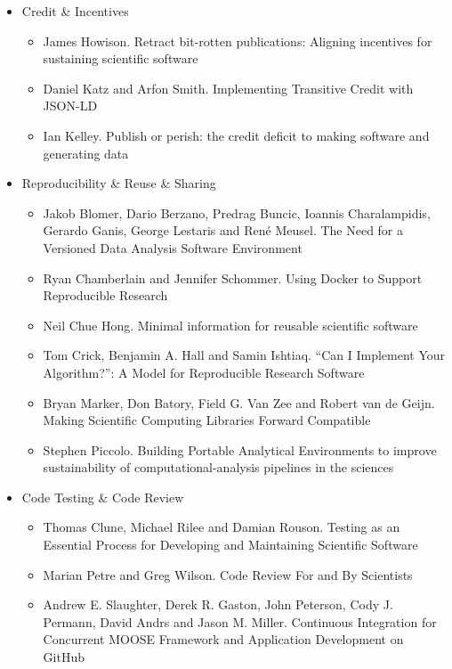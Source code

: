 \documentclass[11pt, oneside]{amsart}
\begin{document}
\begin{itemize}
\item Credit \& Incentives
\begin{itemize}
\item James Howison. Retract bit-rotten publications: Aligning incentives for sustaining scientific software~\cite{wssspe2_howison}
\item Daniel Katz and Arfon Smith. Implementing Transitive Credit with {JSON-LD}~\cite{wssspe2_katz}
\item Ian Kelley. Publish or perish: the credit deficit to making software and generating data~\cite{wssspe2_kelley}
\end{itemize}

\item Reproducibility \& Reuse \& Sharing
\begin{itemize}
\item Jakob Blomer, Dario Berzano, Predrag Buncic, Ioannis Charalampidis, Gerardo Ganis, George Lestaris and Ren\'{e} Meusel. The Need for a Versioned Data Analysis Software Environment~\cite{wssspe2_blomer}
\item Ryan Chamberlain and Jennifer Schommer. Using {Docker} to Support Reproducible Research~\cite{wssspe2_chamberlain}
\item Neil Chue Hong. Minimal information for reusable scientific software~\cite{wssspe2_chue_hong}
\item Tom Crick, Benjamin A. Hall and Samin Ishtiaq. ``Can I Implement Your Algorithm?'': A Model for Reproducible Research Software~\cite{wssspe2_crick}
\item Bryan Marker, Don Batory, Field G. Van Zee and Robert van de Geijn. Making Scientific Computing Libraries Forward Compatible~\cite{wssspe2_marker}
\item Stephen Piccolo. Building Portable Analytical Environments to improve sustainability of computational-analysis pipelines in the sciences~\cite{wssspe2_piccolo}
\end{itemize}

\item Code Testing \& Code Review
\begin{itemize}
\item Thomas Clune, Michael Rilee and Damian Rouson. Testing as an Essential Process for Developing and Maintaining Scientific Software~\cite{wssspe2_clune}
\item Marian Petre and Greg Wilson. Code Review For and By Scientists~\cite{wssspe2_petre}
\item Andrew E. Slaughter, Derek R. Gaston, John Peterson, Cody J. Permann, David Andrs and Jason M. Miller. Continuous Integration for Concurrent {MOOSE} Framework and Application Development on {GitHub}~\cite{wssspe2_slaughter}
\end{itemize}

\end{itemize}
\end{document}
